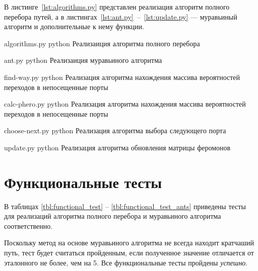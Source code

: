 В листинге~\ref{lst:algorithms.py} представлен реализация алгоритм полного перебора путей, а в листингах~\ref{lst:ant.py}~--~\ref{lst:update.py} --- муравьиный алгоритм и дополнительные к нему функции.


\clearpage
{}
{algorithms.py} %
{python} %
{Реализаиция алгоритма полного перебора} %
\clearpage


{ant.py} %
{python} %
{Реализаиция муравьиного алгоритма} %
\clearpage



{find-way.py} %
{python} %
{Реализация алгоритма нахождения массива вероятностей переходов в непосещенные порты} %
\clearpage



{calc-phero.py} %
{python} %
{Реализация алгоритма нахождения массива вероятностей переходов в непосещенные порты} %

{choose-next.py} %
{python} %
{Реализация алгоритма выбора следующего порта} %


{update.py} %
{python} %
{Реализация алгоритма обновления матрицы феромонов} %
\clearpage

\section{Функциональные тесты}

В таблицах \ref{tbl:functional_test} -- \ref{tbl:functional_test_ants} приведены тесты для реализаций алгоритма полного перебора и муравьиного алгоритма соответственно.

Поскольку метод на основе муравьиного алгоритма не всегда находит кратчаший путь, тест будет считаться пройденным, если полученное значение отличается от эталонного не более, чем на 5.
Все функциональные тесты пройдены \textit{успешно}.

